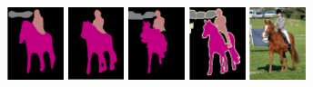 \begin{figure}[h!] %
	\begin{subfigure}{0.55\textwidth}
		 \\
		\includegraphics[width=0.18\textwidth]{image/result/compare/my_horse.pdf}
		\includegraphics[width=0.18\textwidth]{image/result/compare/fcn_horse.png}
		\includegraphics[width=0.18\textwidth]{image/result/compare/sds_horse.png}
		\includegraphics[width=0.18\textwidth]{image/result/compare/gt_horse.pdf}
		\includegraphics[width=0.18\textwidth]{image/result/compare/im_horse.pdf}
		\\

\end{subfigure}
\end{figure}
